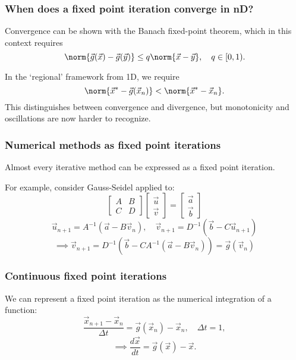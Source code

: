 \documentclass{beamer}
\begin{document}
\begin{frame}
\frametitle{When does a fixed point iteration converge in nD?}

Convergence can be shown with the Banach fixed-point theorem, which in this context requires
\begin{equation*}
	\norm{\vec{g}(\vec{x}) - \vec{g}(\vec{y})} \leq q \norm{\vec{x} - \vec{y}}, \quad q \in [0,1).
\end{equation*}

In the `regional' framework from 1D, we require
\begin{equation*}
	\norm{\vec{x}^* - \vec{g}(\vec{x}_n)} < \norm{\vec{x}^* - \vec{x}_n} .
\end{equation*}
This distinguishes between convergence and divergence, but monotonicity and oscillations are now harder to recognize.
\end{frame}

\begin{frame}
\frametitle{Numerical methods as fixed point iterations}

Almost every iterative method can be expressed as a fixed point iteration.

For example, consider Gauss-Seidel applied to:
\begin{equation*}
	\begin{bmatrix} A & B \\ C & D \end{bmatrix} \begin{bmatrix} \vec{u} \\ \vec{v} \end{bmatrix} = \begin{bmatrix} \vec{a} \\ \vec{b} \end{bmatrix}
\end{equation*}
\begin{equation*}
	\vec{u}_{n+1} = A^{-1} \left ( \vec{a} - B \vec{v}_n \right ), \quad \vec{v}_{n+1} = D^{-1} \left ( \vec{b} - C \vec{u}_{n+1} \right )
\end{equation*}
\begin{equation*}
	\implies \vec{v}_{n+1} = D^{-1} \left ( \vec{b} - C A^{-1} \left ( \vec{a} - B \vec{v}_n \right ) \right ) = \vec{g} ( \vec{v}_n )
\end{equation*}

\end{frame}

\begin{frame}
\frametitle{Continuous fixed point iterations}

We can represent a fixed point iteration as the numerical integration of a function:
\begin{equation*}
	\frac{\vec{x}_{n+1} - \vec{x}_n}{\Delta t} = \vec{g}(\vec{x}_n) - \vec{x}_n, \quad \Delta t = 1,
\end{equation*}
\begin{equation*}
	\implies \frac{d \vec{x}}{dt} = \vec{g}(\vec{x}) - \vec{x}.
\end{equation*}

\end{frame}
\end{document}
